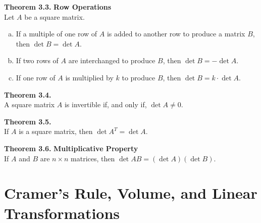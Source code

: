 \documentclass[10pt]{book}
\newenvironment{boxthm}{\begin{mdframed}[backgroundcolor=gray!30,nobreak=true]}{\end{mdframed}}
\begin{document}
\begin{boxthm}
	\textbf{Theorem 3.3.}
	\textbf{Row Operations} \\
	Let $A$ be a square matrix.
	\begin{enumerate}[(a)]\itemsep0em
		\item If a multiple of one row of $A$ is added to another row to produce a matrix $B$, then $\det B=\det A$.
		\item If two rows of $A$ are interchanged to produce $B$, then $\det B=-\det A$.
		\item If one row of $A$ is multiplied by $k$ to produce $B$, then $\det B=k\cdot\det A$.
	\end{enumerate}
\end{boxthm}
\begin{boxthm}
	\textbf{Theorem 3.4.} \\
	A square matrix $A$ is invertible if, and only if, $\det A\neq 0$.
\end{boxthm}
\begin{boxthm}
	\textbf{Theorem 3.5.} \\
	If $A$ is a square matrix, then $\det A^T=\det A$.
\end{boxthm}
\begin{boxthm}
	\textbf{Theorem 3.6.}
	\textbf{Multiplicative Property} \\
	If $A$ and $B$ are $n\times n$ matrices, then $\det AB = (\det A)(\det B)$.
\end{boxthm}
\vfill


\newpage


\section[Cramer's Rule, Volume, \& Linear Trans.]{Cramer's Rule, Volume, and Linear Transformations}
\end{document}
